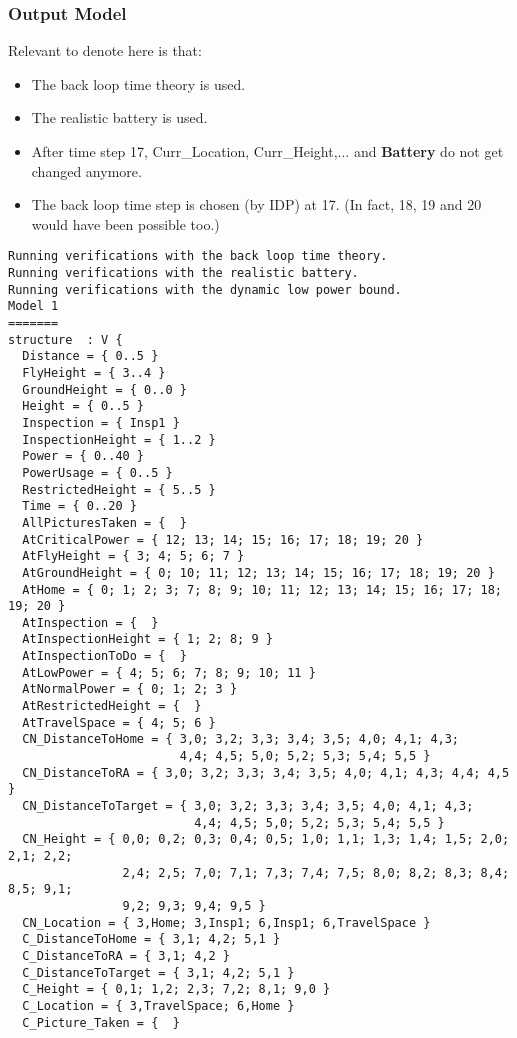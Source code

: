 \documentclass[12pt]{extarticle}
\begin{document}
\subsubsection*{Output Model}
Relevant to denote here is that:
\begin{itemize}
    \item The back loop time theory is used.
    \item The realistic battery is used.
    \item After time step 17, Curr\_Location, Curr\_Height,... and \textbf{Battery} do not get changed anymore.
    \item The back loop time step is chosen (by IDP) at 17. (In fact, 18, 19 and 20 would have been possible too.)
\end{itemize}
\begin{lstlisting}[basicstyle=\tiny]
Running verifications with the back loop time theory.
Running verifications with the realistic battery.
Running verifications with the dynamic low power bound.
Model 1
=======
structure  : V {
  Distance = { 0..5 }
  FlyHeight = { 3..4 }
  GroundHeight = { 0..0 }
  Height = { 0..5 }
  Inspection = { Insp1 }
  InspectionHeight = { 1..2 }
  Power = { 0..40 }
  PowerUsage = { 0..5 }
  RestrictedHeight = { 5..5 }
  Time = { 0..20 }
  AllPicturesTaken = {  }
  AtCriticalPower = { 12; 13; 14; 15; 16; 17; 18; 19; 20 }
  AtFlyHeight = { 3; 4; 5; 6; 7 }
  AtGroundHeight = { 0; 10; 11; 12; 13; 14; 15; 16; 17; 18; 19; 20 }
  AtHome = { 0; 1; 2; 3; 7; 8; 9; 10; 11; 12; 13; 14; 15; 16; 17; 18; 19; 20 }
  AtInspection = {  }
  AtInspectionHeight = { 1; 2; 8; 9 }
  AtInspectionToDo = {  }
  AtLowPower = { 4; 5; 6; 7; 8; 9; 10; 11 }
  AtNormalPower = { 0; 1; 2; 3 }
  AtRestrictedHeight = {  }
  AtTravelSpace = { 4; 5; 6 }
  CN_DistanceToHome = { 3,0; 3,2; 3,3; 3,4; 3,5; 4,0; 4,1; 4,3;
                        4,4; 4,5; 5,0; 5,2; 5,3; 5,4; 5,5 }
  CN_DistanceToRA = { 3,0; 3,2; 3,3; 3,4; 3,5; 4,0; 4,1; 4,3; 4,4; 4,5 }
  CN_DistanceToTarget = { 3,0; 3,2; 3,3; 3,4; 3,5; 4,0; 4,1; 4,3;
                          4,4; 4,5; 5,0; 5,2; 5,3; 5,4; 5,5 }
  CN_Height = { 0,0; 0,2; 0,3; 0,4; 0,5; 1,0; 1,1; 1,3; 1,4; 1,5; 2,0; 2,1; 2,2;
                2,4; 2,5; 7,0; 7,1; 7,3; 7,4; 7,5; 8,0; 8,2; 8,3; 8,4; 8,5; 9,1;
                9,2; 9,3; 9,4; 9,5 }
  CN_Location = { 3,Home; 3,Insp1; 6,Insp1; 6,TravelSpace }
  C_DistanceToHome = { 3,1; 4,2; 5,1 }
  C_DistanceToRA = { 3,1; 4,2 }
  C_DistanceToTarget = { 3,1; 4,2; 5,1 }
  C_Height = { 0,1; 1,2; 2,3; 7,2; 8,1; 9,0 }
  C_Location = { 3,TravelSpace; 6,Home }
  C_Picture_Taken = {  }

\end{lstlisting}
\end{document}

